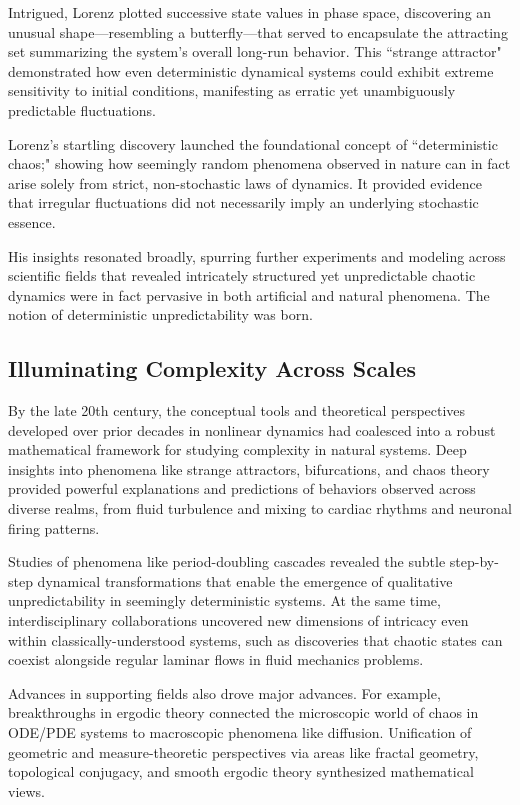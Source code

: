 Intrigued, Lorenz plotted successive state values in phase space, discovering an unusual shape---resembling a butterfly---that served to encapsulate the attracting set summarizing the system's overall long-run behavior. This ``strange attractor" demonstrated how even deterministic dynamical systems could exhibit extreme sensitivity to initial conditions, manifesting as erratic yet unambiguously predictable fluctuations.

Lorenz's startling discovery launched the foundational concept of ``deterministic chaos;" showing how seemingly random phenomena observed in nature can in fact arise solely from strict, non-stochastic laws of dynamics. It provided evidence that irregular fluctuations did not necessarily imply an underlying stochastic essence.

His insights resonated broadly, spurring further experiments and modeling across scientific fields that revealed intricately structured yet unpredictable chaotic dynamics were in fact pervasive in both artificial and natural phenomena. The notion of deterministic unpredictability was born.

\subsection{Illuminating Complexity Across Scales}

By the late 20th century, the conceptual tools and theoretical perspectives developed over prior decades in nonlinear dynamics had coalesced into a robust mathematical framework for studying complexity in natural systems. Deep insights into phenomena like strange attractors, bifurcations, and chaos theory provided powerful explanations and predictions of behaviors observed across diverse realms, from fluid turbulence and mixing to cardiac rhythms and neuronal firing patterns.

Studies of phenomena like period-doubling cascades revealed the subtle step-by-step dynamical transformations that enable the emergence of qualitative unpredictability in seemingly deterministic systems. At the same time, interdisciplinary collaborations uncovered new dimensions of intricacy even within classically-understood systems, such as discoveries that chaotic states can coexist alongside regular laminar flows in fluid mechanics problems.

Advances in supporting fields also drove major advances. For example, breakthroughs in ergodic theory connected the microscopic world of chaos in ODE/PDE systems to macroscopic phenomena like diffusion. Unification of geometric and measure-theoretic perspectives via areas like fractal geometry, topological conjugacy, and smooth ergodic theory synthesized mathematical views.

